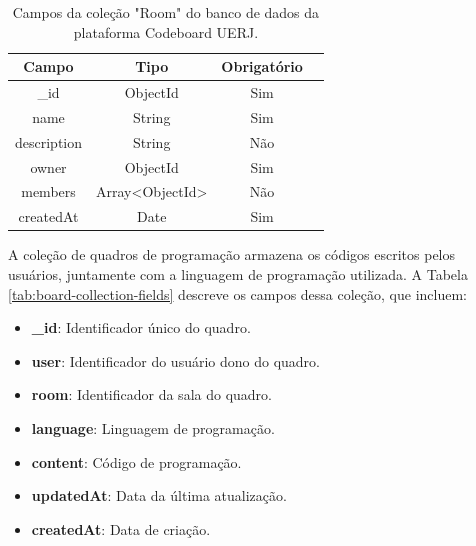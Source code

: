 \begin{table}[H]
    \centering
    \renewcommand{\arraystretch}{1.3} 
    \begin{tabular}{|c|c|c|c|}
        \hline
        \textbf{Campo}              & \textbf{Tipo}   & \textbf{Obrigatório} \\
        \hline
        \_id              & ObjectId        & Sim                  \\
        \hline
        name                          & String          & Sim                  \\
        \hline
        description               & String          & Não                  \\
        \hline
        owner          & ObjectId        & Sim                  \\
        \hline
        members        & Array<ObjectId> & Não                  \\
        \hline
        createdAt           & Date            & Sim                  \\
        \hline
    \end{tabular}
    \caption{Campos da coleção "Room" do banco de dados da plataforma Codeboard UERJ.}
    \label{tab:room-collection-fields}
\end{table}


A coleção de quadros de programação armazena os códigos escritos pelos usuários, juntamente com a linguagem de programação utilizada. A Tabela \ref{tab:board-collection-fields} descreve os campos dessa coleção, que incluem:

\begin{itemize}
    \item \textbf{\_id}: Identificador único do quadro.
    \item \textbf{user}: Identificador do usuário dono do quadro.
    \item \textbf{room}: Identificador da sala do quadro.
    \item \textbf{language}: Linguagem de programação.
    \item \textbf{content}: Código de programação.
    \item \textbf{updatedAt}: Data da última atualização.
    \item \textbf{createdAt}: Data de criação.
\end{itemize}

